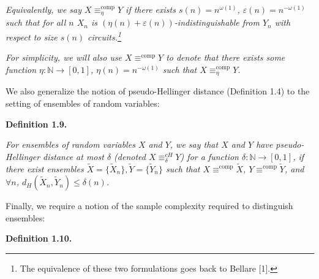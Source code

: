 \emph{Equivalently, we say $X\equiv_{\eta}^{\mathrm{comp}}Y$ if there exists $s(n)=n^{\omega(1)}$, $\varepsilon(n)=n^{-\omega(1)}$ such that for all $n$ $X_{n}$ is $(\eta(n)+\varepsilon(n))$-indistinguishable from $Y_{n}$ with respect to size $s(n)$ circuits.\footnote{The equivalence of these two formulations goes back to Bellare [1].}}\par




\emph{For simplicity, we will also use $X\equiv^{\mathrm{comp}}Y$ to denote that there exists some function $\eta:\mathbb{N}\rightarrow[0,1]$, $\eta(n)=n^{-\omega(1)}$ such that $X\equiv^{\mathrm{comp}}_{\eta}Y$.}\par






We also generalize the notion of pseudo-Hellinger distance (Definition 1.4) to the setting of ensembles of random variables:\par





\par\medskip\noindent\textbf{
\textbf{Definition 1.9}\textbf{.}
}\par



\emph{For ensembles of random variables $X$ and $Y$, we say that $X$ and $Y$ have pseudo-Hellinger distance at most $\delta$ (denoted $X\equiv_{\delta}^{cH}Y$) for a function $\delta:\mathbb{N}\rightarrow[0,1]$, if there exist ensembles $\widetilde{X}=\{\widetilde{X}_{n}\},\widetilde{Y}=\{\widetilde{Y}_{n}\}$ such that $X\equiv^{\mathrm{comp}}\widetilde{X}$, $Y\equiv^{\mathrm{comp}}\widetilde{Y}$, and $\forall n$, $d_{H}(\widetilde{X}_{n},\widetilde{Y}_{n})\leq\delta(n)$.}\par






Finally, we require a notion of the sample complexity required to distinguish ensembles:\par





\par\medskip\noindent\textbf{
\textbf{Definition 1.10}\textbf{.}
}\par



